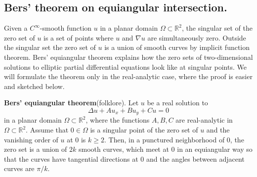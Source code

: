 \documentclass{article}
\begin{document}
\subsection{Bers' theorem on equiangular intersection.}
Given a $C^\infty$-smooth function $u$ in a planar domain $\Omega\subset\mathbb{R}^2$, the singular set of the zero set of $u$ is a set of points where $u$ and $\nabla u$ are simultaneously zero. Outside the singular set the zero set of $u$ is a union of smooth curves by implicit function theorem. Bers' equiangular theorem explains how the zero sets of two-dimensional solutions to elliptic partial differential equations look like at singular points. We will formulate the theorem only in the real-analytic case, where the proof is easier and sketched below.


\textbf{Bers' equiangular theorem}(folklore). Let $u$ be a real solution to
$$\Delta u + Au_x+Bu_y+Cu =0$$
in a planar domain $\Omega\subset\mathbb{R}^2$, where the
functions $A,B,C$ are real-analytic in $\Omega\subset\mathbb{R}^2$. 
Assume that $0\in \Omega$ is a singular point of the zero set of $u$ and
the vanishing order of $u$ at $0$ is $k\geq 2$. Then, in a punctured neighborhood of $0$, the zero set is a union of $2k$ smooth curves, which  meet at $0$ in an equiangular way so that the curves have tangential directions at $0$ and the angles between adjacent curves are $\pi/k$. 
\end{document}
